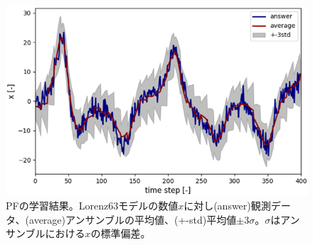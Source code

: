 \documentclass[dvipdfmx, 9pt, a4paper]{jsarticle}
\begin{document}
\begin{figure}[t]
\begin{center}
\includegraphics[width=12cm]{"fig17.png"}
\caption{PFの学習結果。Lorenz63モデルの数値$x$に対し(answer)観測データ、(average)アンサンブルの平均値、(+-std)平均値$\pm 3\sigma$。$\sigma$はアンサンブルにおける$x$の標準偏差。}
\end{center}
\end{figure}
\end{document}
